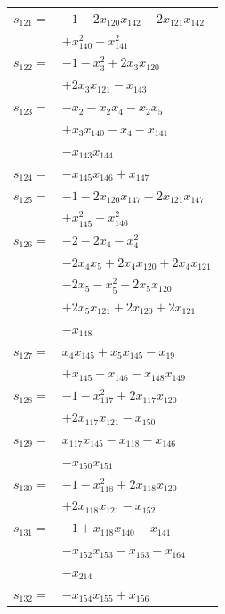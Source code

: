 \begin{longtable}{@{}r@{\;}l@{}}
\(s_{121}=\) & \(\displaystyle -1 -2x_{120}x_{142} -2x_{121}x_{142}\) \\
 & \(\displaystyle +x_{140}^{2} +x_{141}^{2}\) \\[3pt]
\(s_{122}=\) & \(\displaystyle -1 -x_{3}^{2} +2x_{3}x_{120}\) \\
 & \(\displaystyle +2x_{3}x_{121} -x_{143}\) \\[3pt]
\(s_{123}=\) & \(\displaystyle -x_{2} -x_{2}x_{4} -x_{2}x_{5}\) \\
 & \(\displaystyle +x_{3}x_{140} -x_{4} -x_{141}\) \\
 & \(\displaystyle -x_{143}x_{144}\) \\[3pt]
\(s_{124}=\) & \(\displaystyle -x_{145}x_{146} +x_{147}\) \\[3pt]
\(s_{125}=\) & \(\displaystyle -1 -2x_{120}x_{147} -2x_{121}x_{147}\) \\
 & \(\displaystyle +x_{145}^{2} +x_{146}^{2}\) \\[3pt]
\(s_{126}=\) & \(\displaystyle -2 -2x_{4} -x_{4}^{2}\) \\
 & \(\displaystyle -2x_{4}x_{5} +2x_{4}x_{120} +2x_{4}x_{121}\) \\
 & \(\displaystyle -2x_{5} -x_{5}^{2} +2x_{5}x_{120}\) \\
 & \(\displaystyle +2x_{5}x_{121} +2x_{120} +2x_{121}\) \\
 & \(\displaystyle -x_{148}\) \\[3pt]
\(s_{127}=\) & \(\displaystyle x_{4}x_{145} +x_{5}x_{145} -x_{19}\) \\
 & \(\displaystyle +x_{145} -x_{146} -x_{148}x_{149}\) \\[3pt]
\(s_{128}=\) & \(\displaystyle -1 -x_{117}^{2} +2x_{117}x_{120}\) \\
 & \(\displaystyle +2x_{117}x_{121} -x_{150}\) \\[3pt]
\(s_{129}=\) & \(\displaystyle x_{117}x_{145} -x_{118} -x_{146}\) \\
 & \(\displaystyle -x_{150}x_{151}\) \\[3pt]
\(s_{130}=\) & \(\displaystyle -1 -x_{118}^{2} +2x_{118}x_{120}\) \\
 & \(\displaystyle +2x_{118}x_{121} -x_{152}\) \\[3pt]
\(s_{131}=\) & \(\displaystyle -1 +x_{118}x_{140} -x_{141}\) \\
 & \(\displaystyle -x_{152}x_{153} -x_{163} -x_{164}\) \\
 & \(\displaystyle -x_{214}\) \\[3pt]
\(s_{132}=\) & \(\displaystyle -x_{154}x_{155} +x_{156}\) \\[3pt]

\end{longtable}

